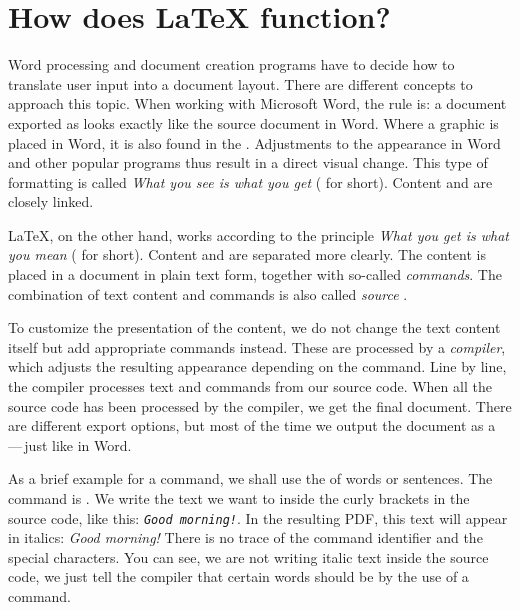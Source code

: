 \chapter{How does \LaTeX{} function?}
\label{sec:basic-functionality}


Word processing and document creation programs have to decide how to translate user input into a document layout.
There are different concepts to approach this topic.
When working with Microsoft Word, the rule is: a document exported as  looks exactly like the source document in Word. 
Where a graphic is placed in Word, it is also found in the . 
Adjustments to the appearance in Word and other popular programs thus result in a direct visual change. 
This type of formatting is called \emph{What you see is what you get} ( for short). 
Content and  are closely linked.

\LaTeX{}, on the other hand, works according to the principle \emph{What you get is what you mean} ( for short). 
Content and  are separated more clearly.
The content is placed in a document in plain text form, together with so-called \emph{commands}. 
The combination of text content and commands is also called \emph{source} .

To customize the presentation of the content, we do not change the text content itself but add appropriate commands instead. 
These are processed by a \emph{compiler}, which adjusts the resulting appearance depending on the command. 
Line by line, the compiler processes text and commands from our source code. 
When all the source code has been processed by the compiler, we get the final document. 
There are different export options, but most of the time we output the document as a \,---\,just like in Word.

As a brief example for a command, we shall use the  of words or sentences. 
The command is \texttt{\emph{}}. 
We write the text we want to  inside the curly brackets in the source code, like this: 
\texttt{\emph{Good morning!}}. 
In the resulting PDF, this text will appear in italics: \emph{Good morning!} 
There is no trace of the command identifier and the special characters. 
You can see, we are not writing italic text inside the source code, we just tell the compiler that certain words should be  by the use of a command.

